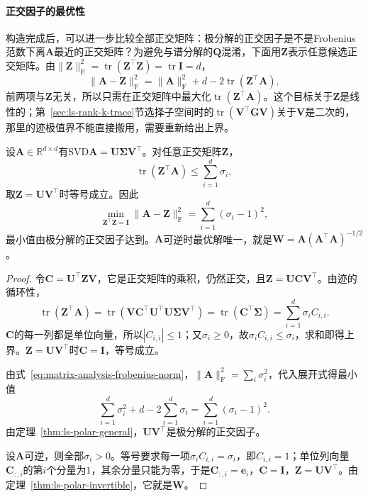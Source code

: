 \paragraph{正交因子的最优性}

构造完成后，可以进一步比较全部正交矩阵：极分解的正交因子是不是Frobenius范数下离$\bm A$最近的正交矩阵？为避免与谱分解的$\bm Q$混淆，下面用$\bm Z$表示任意候选正交矩阵。由$\lVert\bm Z\rVert_{\mathrm F}^2=\operatorname{tr}(\bm Z^\top\bm Z)=\operatorname{tr}\bm I=d$，
\[
 \lVert\bm A-\bm Z\rVert_{\mathrm F}^2
 =\lVert\bm A\rVert_{\mathrm F}^2+d-2\operatorname{tr}(\bm Z^\top\bm A),
\]
前两项与$\bm Z$无关，所以只需在正交矩阵中最大化$\operatorname{tr}(\bm Z^\top\bm A)$。这个目标关于$\bm Z$是线性的；第~\ref{sec:ls-rank-k-trace}节选择子空间时的$\operatorname{tr}(\bm V^\top\bm G\bm V)$关于$\bm V$是二次的，那里的迹极值界不能直接搬用，需要重新给出上界。

\begin{theorem}[最佳正交逼近]
\label{thm:ls-best-orthogonal-approximation}
设$\bm A\in\mathbb R^{d\times d}$有SVD$\bm A=\bm U\bm\Sigma\bm V^\top$。对任意正交矩阵$\bm Z$，
\[
 \operatorname{tr}(\bm Z^\top\bm A)\leq\sum_{i=1}^d\sigma_i ,
\]
取$\bm Z=\bm U\bm V^\top$时等号成立。因此
\[
 \min_{\bm Z^\top\bm Z=\bm I}\lVert\bm A-\bm Z\rVert_{\mathrm F}^2
 =\sum_{i=1}^d(\sigma_i-1)^2 ,
\]
最小值由极分解的正交因子达到。$\bm A$可逆时最优解唯一，就是$\bm W=\bm A(\bm A^\top\bm A)^{-1/2}$。
\end{theorem}
\begin{proof}
令$\bm C=\bm U^\top\bm Z\bm V$，它是正交矩阵的乘积，仍然正交，且$\bm Z=\bm U\bm C\bm V^\top$。由迹的循环性，
\[
 \operatorname{tr}(\bm Z^\top\bm A)
 =\operatorname{tr}(\bm V\bm C^\top\bm U^\top\bm U\bm\Sigma\bm V^\top)
 =\operatorname{tr}(\bm C^\top\bm\Sigma)
 =\sum_{i=1}^d\sigma_iC_{i,i}.
\]
$\bm C$的每一列都是单位向量，所以$|C_{i,i}|\leq1$；又$\sigma_i\geq0$，故$\sigma_iC_{i,i}\leq\sigma_i$，求和即得上界。$\bm Z=\bm U\bm V^\top$时$\bm C=\bm I$，等号成立。

由式~\eqref{eq:matrix-analysis-frobenius-norm}，$\lVert\bm A\rVert_{\mathrm F}^2=\sum_i\sigma_i^2$，代入展开式得最小值
\[
 \sum_{i=1}^d\sigma_i^2+d-2\sum_{i=1}^d\sigma_i
 =\sum_{i=1}^d(\sigma_i-1)^2 .
\]
由定理~\ref{thm:ls-polar-general}，$\bm U\bm V^\top$是极分解的正交因子。

设$\bm A$可逆，则全部$\sigma_i>0$。等号要求每一项$\sigma_iC_{i,i}=\sigma_i$，即$C_{i,i}=1$；单位列向量$\bm C_{:,i}$的第$i$个分量为$1$，其余分量只能为零，于是$\bm C_{:,i}=\bm e_i$，$\bm C=\bm I$，$\bm Z=\bm U\bm V^\top$。由定理~\ref{thm:ls-polar-invertible}，它就是$\bm W$。
\end{proof}

